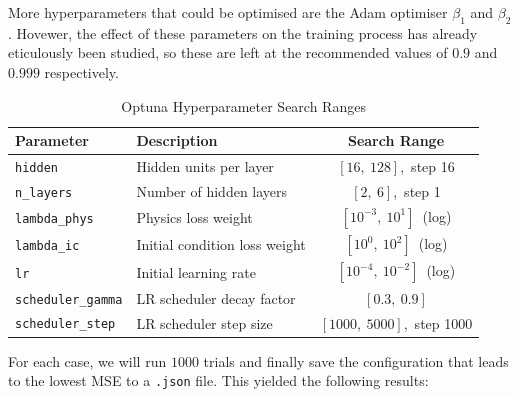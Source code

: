 \documentclass[we,twoside,openright,a4paper,11pt]{uantwerpenbamathesis}
\begin{document}
More hyperparameters that could be optimised are the Adam optimiser $\beta_1$ and $\beta_2$. Hovewer, the effect of these parameters on the training process has already eticulously been studied, so these are left at the recommended values of $0.9$ and $0.999$ respectively.

\begin{table}[H]
\centering
\caption{Optuna Hyperparameter Search Ranges}\label{tab:optuna_hyperparams}
\begin{tabular}{llc}
\toprule
\textbf{Parameter} & \textbf{Description} & \textbf{Search Range} \\
\midrule
\texttt{hidden}           & Hidden units per layer         & $[16,\ 128]$,\ step 16 \\
\texttt{n\_layers}        & Number of hidden layers        & $[2,\ 6]$,\ step 1 \\
\texttt{lambda\_phys}     & Physics loss weight            & $[10^{-3},\ 10^{1}]$\ (log) \\
\texttt{lambda\_ic}       & Initial condition loss weight  & $[10^{0},\ 10^{2}]$\ (log) \\
\texttt{lr}               & Initial learning rate          & $[10^{-4},\ 10^{-2}]$\ (log) \\
\texttt{scheduler\_gamma} & LR scheduler decay factor      & $[0.3,\ 0.9]$ \\
\texttt{scheduler\_step}  & LR scheduler step size         & $[1000,\ 5000]$,\ step 1000 \\
\bottomrule
\end{tabular}
\end{table}

For each case, we will run $1000$ trials and finally save the configuration that leads to the lowest MSE to a \verb|.json| file. This yielded the following results:
\end{document}
